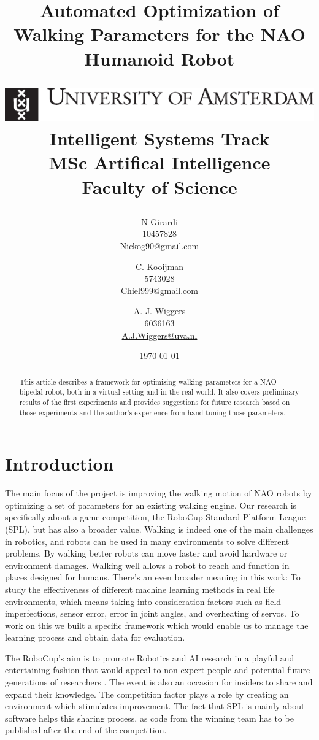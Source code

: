 \documentclass[a4paper, twocolumn]{article}
\title{Automated Optimization of Walking Parameters for the NAO Humanoid Robot\\
\vspace{.5em}
\begin{center}
	\includegraphics[scale=.8]{images/uva}\\ \normalsize
	Intelligent Systems Track\vspace{.4em}\\MSc Artifical Intelligence\\Faculty of Science\\ \vspace{.2em}
\end{center}
}
\author{
N Girardi\\10457828\\\url{Nickog90@gmail.com} \and
C. Kooijman\\5743028\\\url{Chiel999@gmail.com} \and
A. J. Wiggers\\6036163\\\url{A.J.Wiggers@uva.nl}
}
\date{\today}
\begin{document}
\maketitle


\begin{abstract}
	This article describes a framework for optimising walking parameters for a
	NAO bipedal robot, both in a virtual setting and in the real world. It also
	covers preliminary results of the first experiments and provides
	suggestions for future research based on those experiments and the author's
	experience from hand-tuning those parameters.
\end{abstract}

\section{Introduction}
The main focus of the project is improving the walking motion of NAO robots by
optimizing a set of parameters for an existing walking engine. Our research is
specifically about a game competition, the RoboCup Standard Platform League
(SPL), but has also a broader value. Walking is indeed one of the main
challenges in robotics, and robots can be used in many environments to solve
different problems. By walking better robots can move faster and avoid hardware
or environment damages. Walking well allows a robot to reach and function in
places designed for humans. There's an even broader meaning in this work:
To study the effectiveness of different machine learning methods in real
life environments, which means taking into consideration factors such as field
imperfections, sensor error, error in joint angles, and overheating of servos. To work on this
we built a specific framework which would enable us to manage the learning
process and obtain data for evaluation. 

The RoboCup's aim is to promote Robotics and AI research in a playful and
entertaining fashion that would appeal to non-expert people and potential
future generations of researchers \citep{kitano1997robocup}. The event is also
an occasion for insiders to share and expand their knowledge. The competition
factor plays a role by creating an environment which stimulates improvement.
The fact that SPL is mainly about software helps this sharing process, as code
from the winning team has to be published after the end of the competition. 
\end{document}
